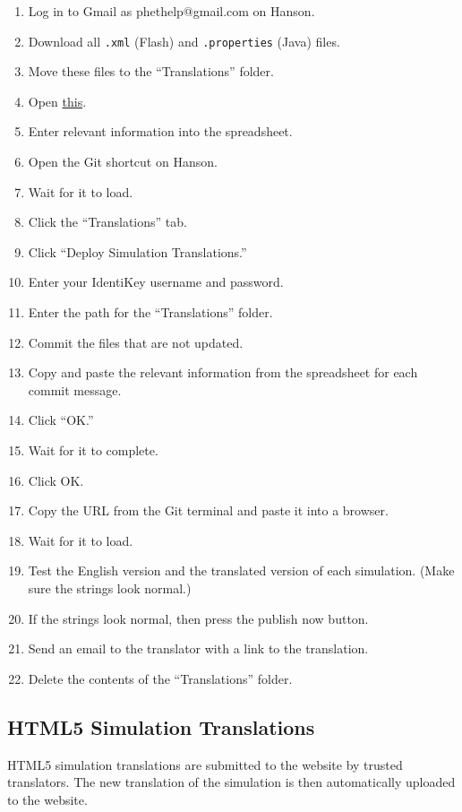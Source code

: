 \documentclass[titlepage]{article}
\begin{document}
		\begin{enumerate}
			\item Log in to Gmail as phethelp@gmail.com on Hanson.
			\item Download all \verb|.xml| (Flash) and \verb|.properties| (Java) files.
			\item Move these files to the ``Translations'' folder. 
			\item Open \href{https://docs.google.com/spreadsheets/d/10co5pwJI6HaJq6RD7fX2xVm3Ks1WpYfXei9scnPGKxM/edit#gid=0}{this}.
			\item Enter relevant information into the spreadsheet.
			\item Open the Git shortcut on Hanson.
			\item Wait for it to load.
			\item Click the ``Translations'' tab.
			\item Click ``Deploy Simulation Translations.''
			\item Enter your IdentiKey username and password.
			\item Enter the path for the ``Translations'' folder.
			\item Commit the files that are not updated.
			\item Copy and paste the relevant information from the spreadsheet for each commit message.
			\item Click ``OK.''
			\item Wait for it to complete.
			\item Click OK.
			\item Copy the URL from the Git terminal and paste it into a browser.
			\item Wait for it to load.
			\item Test the English version and the translated version of each simulation. (Make sure the strings look normal.)
			\item If the strings look normal, then press the publish now button.
			\item Send an email to the translator with a link to the translation.
			\item Delete the contents of the ``Translations'' folder.
		\end{enumerate}

	\subsection{HTML5 Simulation Translations}

HTML5 simulation translations are submitted to the website by trusted translators. The new translation of the simulation is then automatically uploaded to the website.
\end{document}
